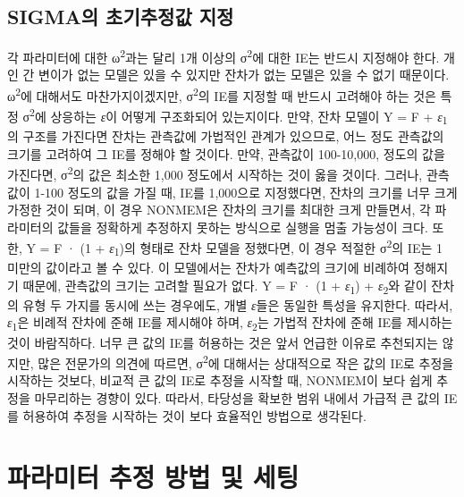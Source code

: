\documentclass[
  11pt,
  krantz2, a4paper, twoside]{krantz}
\theoremstyle{definition}
\theoremstyle{definition}
\theoremstyle{definition}
\theoremstyle{remark}
\begin{document}
\hypertarget{sigmauxc758-uxcd08uxae30uxcd94uxc815uxac12-uxc9c0uxc815}{%
\section{SIGMA의 초기추정값 지정}\label{sigmauxc758-uxcd08uxae30uxcd94uxc815uxac12-uxc9c0uxc815}}

각 파라미터에 대한 ω\textsuperscript{2}과는 달리 1개 이상의 σ\textsuperscript{2}에 대한 IE는 반드시 지정해야 한다. 개인 간 변이가 없는 모델은 있을 수 있지만 잔차가 없는 모델은 있을 수 없기 때문이다. ω\textsuperscript{2}에 대해서도 마찬가지이겠지만, σ\textsuperscript{2}의 IE를 지정할 때 반드시 고려해야 하는 것은 특정 σ\textsuperscript{2}에 상응하는 \emph{ε}이 어떻게 구조화되어 있는지이다. 만약, 잔차 모델이 Y = F + \emph{ε}\textsubscript{1}의 구조를 가진다면 잔차는 관측값에 가법적인 관계가 있으므로, 어느 정도 관측값의 크기를 고려하여 그 IE를 정해야 할 것이다. 만약, 관측값이 100-10,000, 정도의 값을 가진다면, σ\textsuperscript{2}의 값은 최소한 1,000 정도에서 시작하는 것이 옳을 것이다. 그러나, 관측값이 1-100 정도의 값을 가질 때, IE를 1,000으로 지정했다면, 잔차의 크기를 너무 크게 가정한 것이 되며, 이 경우 NONMEM은 잔차의 크기를 최대한 크게 만들면서, 각 파라미터의 값들을 정확하게 추정하지 못하는 방식으로 실행을 멈출 가능성이 크다. 또한, Y = F · (1 + \emph{ε}\textsubscript{1})의 형태로 잔차 모델을 정했다면, 이 경우 적절한 σ\textsuperscript{2}의 IE는 1 미만의 값이라고 볼 수 있다. 이 모델에서는 잔차가 예측값의 크기에 비례하여 정해지기 때문에, 관측값의 크기는 고려할 필요가 없다. Y = F · (1 + \emph{ε}\textsubscript{1}) + \emph{ε}\textsubscript{2}와 같이 잔차의 유형 두 가지를 동시에 쓰는 경우에도, 개별 \emph{ε}들은 동일한 특성을 유지한다. 따라서, \emph{ε}\textsubscript{1}은 비례적 잔차에 준해 IE를 제시해야 하며, \emph{ε}\textsubscript{2}는 가법적 잔차에 준해 IE를 제시하는 것이 바람직하다. 너무 큰 값의 IE를 허용하는 것은 앞서 언급한 이유로 추천되지는 않지만, 많은 전문가의 의견에 따르면, σ\textsuperscript{2}에 대해서는 상대적으로 작은 값의 IE로 추정을 시작하는 것보다, 비교적 큰 값의 IE로 추정을 시작할 때, NONMEM이 보다 쉽게 추정을 마무리하는 경향이 있다. 따라서, 타당성을 확보한 범위 내에서 가급적 큰 값의 IE를 허용하여 추정을 시작하는 것이 보다 효율적인 방법으로 생각된다.

\hypertarget{estimation-methods}{%
\chapter{파라미터 추정 방법 및 세팅}\label{estimation-methods}}
\end{document}
